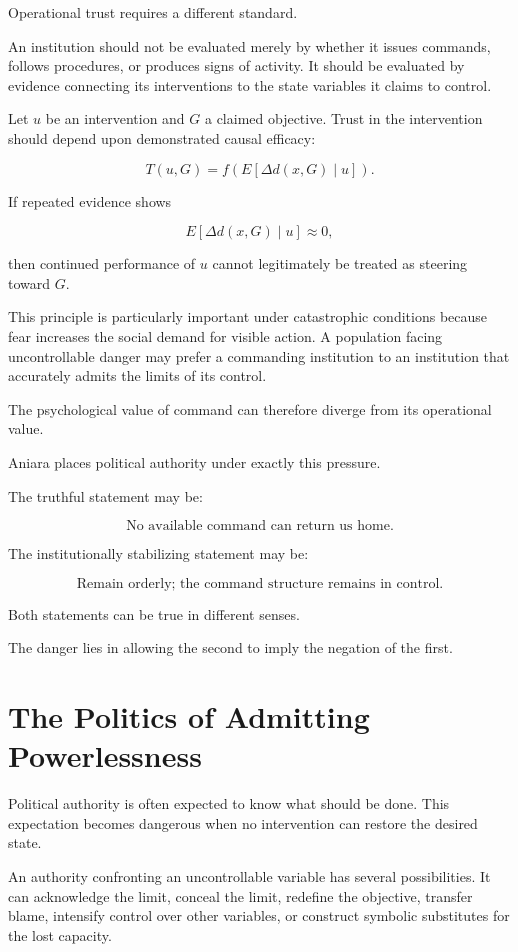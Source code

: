 \documentclass[11pt,oneside]{book}
\theoremstyle{definition}
\theoremstyle{remark}
\begin{document}
Operational trust requires a different standard.

An institution should not be evaluated merely by whether it issues commands, follows procedures, or produces signs of activity. It should be evaluated by evidence connecting its interventions to the state variables it claims to control.

Let \(u\) be an intervention and \(G\) a claimed objective. Trust in the intervention should depend upon demonstrated causal efficacy:

\[
T(u,G)
=
f\!\left(
E[
\Delta d(x,G)\mid u
]
\right).
\]

If repeated evidence shows

\[
E[
\Delta d(x,G)\mid u
]
\approx0,
\]

then continued performance of \(u\) cannot legitimately be treated as steering toward \(G\).

This principle is particularly important under catastrophic conditions because fear increases the social demand for visible action. A population facing uncontrollable danger may prefer a commanding institution to an institution that accurately admits the limits of its control.

The psychological value of command can therefore diverge from its operational value.

Aniara places political authority under exactly this pressure.

The truthful statement may be:

\[
\text{No available command can return us home.}
\]

The institutionally stabilizing statement may be:

\[
\text{Remain orderly; the command structure remains in control.}
\]

Both statements can be true in different senses.

The danger lies in allowing the second to imply the negation of the first.

\section{The Politics of Admitting Powerlessness}

Political authority is often expected to know what should be done. This expectation becomes dangerous when no intervention can restore the desired state.

An authority confronting an uncontrollable variable has several possibilities. It can acknowledge the limit, conceal the limit, redefine the objective, transfer blame, intensify control over other variables, or construct symbolic substitutes for the lost capacity.
\end{document}

